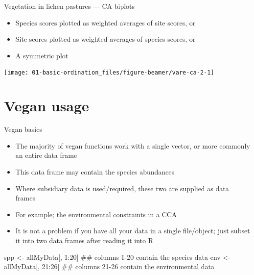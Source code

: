 \documentclass[10pt,ignorenonframetext,compress, aspectratio=169]{beamer}
\newenvironment{Shaded}{\begin{snugshade}}{\end{snugshade}}
\newcommand{\DecValTok}[1]{\textcolor[rgb]{0.00,0.00,0.81}{{#1}}}
\newcommand{\StringTok}[1]{\textcolor[rgb]{0.31,0.60,0.02}{{#1}}}
\newcommand{\NormalTok}[1]{{#1}}
\providecommand{\tightlist}{%
  \setlength{\itemsep}{0pt}\setlength{\parskip}{0pt}}
\begin{document}
\begin{frame}{Vegetation in lichen pastures --- CA biplots}

\begin{itemize}
\tightlist
\item
  Species scores plotted as weighted averages of site scores, or
\item
  Site scores plotted as weighted averages of species scores, or
\item
  A symmetric plot
\end{itemize}

\begin{center}\texttt{[image: 01-basic-ordination\_files/figure-beamer/vare-ca-2-1]} \end{center}

\end{frame}

\section{Vegan usage}\label{vegan-usage}

\begin{frame}[fragile]{Vegan basics}

\begin{itemize}
\tightlist
\item
  The majority of vegan functions work with a single vector, or more
  commonly an entire data frame
\item
  This data frame may contain the species abundances
\item
  Where subsidiary data is used/required, these two are supplied as data
  frames
\item
  For example; the environmental constraints in a CCA
\item
  It is not a problem if you have all your data in a single file/object;
  just subset it into two data frames after reading it into R
\end{itemize}

\begin{Shaded}
\begin{Highlighting}[]
\NormalTok{spp <-}\StringTok{ }\NormalTok{allMyData[, }\DecValTok{1}\NormalTok{:}\DecValTok{20}\NormalTok{] ## columns 1-20 contain the species data}
\NormalTok{env <-}\StringTok{ }\NormalTok{allMyData[, }\DecValTok{21}\NormalTok{:}\DecValTok{26}\NormalTok{] ## columns 21-26 contain the environmental data}
\end{Highlighting}
\end{Shaded}

\end{frame}
\end{document}
